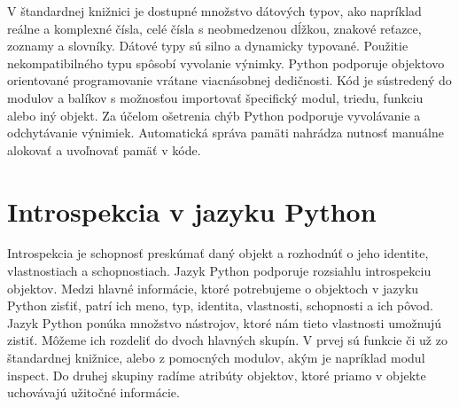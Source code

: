 \documentclass[11pt,oneside,final]{fithesis2}
\begin{document}
	V štandardnej knižnici je dostupné množstvo dátových typov, ako napríklad reálne a komplexné čísla, celé čísla s neobmedzenou dĺžkou, znakové reťazce, zoznamy a slovníky. Dátové typy sú silno a dynamicky typované. Použitie nekompatibilného typu spôsobí vyvolanie výnimky. Python podporuje objektovo orientované programovanie vrátane viacnásobnej dedičnosti. Kód je sústredený do modulov a balíkov s možnosťou importovať špecifický modul, triedu, funkciu alebo iný objekt. Za účelom ošetrenia chýb Python podporuje vyvolávanie a odchytávanie výnimiek. Automatická správa pamäti nahrádza nutnosť manuálne alokovať a uvoľnovať pamäť v kóde.


	\section{Introspekcia v jazyku Python}
		Introspekcia je schopnosť preskúmať daný objekt a rozhodnúť o jeho identite, vlastnostiach a schopnostiach. Jazyk Python podporuje rozsiahlu introspekciu objektov. Medzi hlavné informácie, ktoré potrebujeme o objektoch v jazyku Python zisťiť, patrí ich meno, typ, identita, vlastnosti, schopnosti a ich pôvod. Jazyk Python ponúka množstvo nástrojov, ktoré nám tieto vlastnosti umožnujú zistiť. Môžeme ich rozdeliť do dvoch hlavných skupín. V prvej sú funkcie či už zo štandardnej knižnice, alebo z pomocných modulov, akým je napríklad modul inspect. Do druhej skupiny radíme atribúty objektov, ktoré priamo v objekte uchovávajú užitočné informácie.
		
\end{document}

